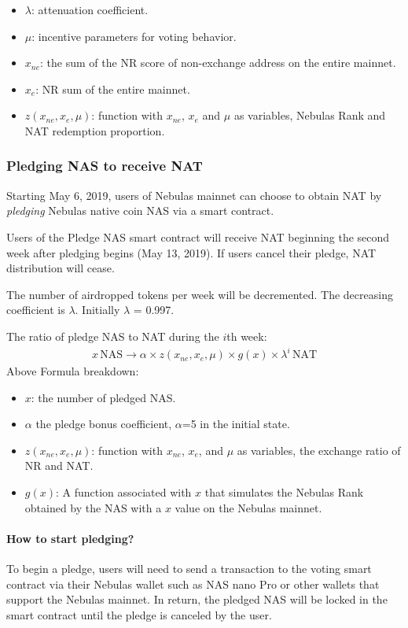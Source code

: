 \begin{itemize}
	\item $\lambda$: attenuation coefficient.
	\item $\mu$: incentive parameters for voting behavior.
	\item $x_{ne}$: the sum of the NR score of non-exchange address on the entire mainnet.
	\item $x_{e}$: NR sum of the entire mainnet.
	\item $z(x_{ne},x_{e},\mu)$: function with $x_{ne}$, $x_{e}$ and $\mu$ as variables, Nebulas Rank and NAT redemption proportion.
\end{itemize}

\subsubsection{Pledging NAS to receive NAT}

Starting May 6, 2019, users of Nebulas mainnet can choose to obtain NAT by
\emph{pledging} Nebulas native coin NAS via a smart contract.

Users of the Pledge NAS smart contract will receive NAT beginning the second week after pledging begins (May 13, 2019). If users cancel their pledge, NAT distribution will cease.

The number of airdropped tokens per week will be decremented. The decreasing coefficient is $\lambda$. Initially $\lambda$ = 0.997.

The ratio of pledge NAS to NAT during the $i$th week:
\begin{align}
x\,\text{NAS} \rightarrow \alpha \times z(x_{ne},x_{e},\mu)\times g(x) \times
  \lambda^{i}\,\text{NAT}
\end{align}
Above Formula breakdown:

\begin{itemize}
	\item $x$: the number of pledged NAS.
	\item $\alpha$ the pledge bonus coefficient, $\alpha$=5 in the initial state.
	\item $z(x_{ne},x_{e},\mu)$: function with $x_{ne}$, $x_{e}$, and $\mu$ as variables, the exchange ratio of NR and NAT.
	\item $g(x)$: A function associated with $x$ that simulates the Nebulas Rank obtained by the NAS with a $x$ value on the Nebulas mainnet.
\end{itemize}


\paragraph{How to start pledging?}
To begin a pledge, users will need to send a transaction to the voting smart contract via their Nebulas wallet such as NAS nano Pro or other wallets that support the Nebulas mainnet. In return, the pledged NAS will be locked in the smart contract until the pledge is canceled by the user.

